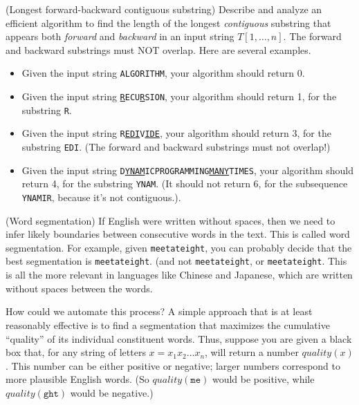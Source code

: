 \newpage
\begin{questions}
  \question[20] (Longest forward-backward contiguous substring) Describe
  and analyze an efficient algorithm to find the length of the longest
  \emph{contiguous} substring that appears both \emph{forward} and
  \emph{backward} in an input string $T[1,\ldots,n]$. The forward and
  backward substrings must NOT overlap.  Here are several examples.
  \begin{itemize}
  \item Given the input string \texttt{ALGORITHM}, your algorithm
    should return 0.

  \item Given the input string
    \texttt{\underline{R}ECU\underline{R}SION}, your algorithm should
    return 1, for the substring \texttt{R}.
  \item Given the input string
    \texttt{R\underline{EDI}V\underline{IDE}}, your algorithm should
    return 3, for the substring \texttt{EDI}. (The forward and backward
    substrings must not overlap!)
  \item Given the input string
    \texttt{D\underline{YNAM}ICPROGRAMMING\underline{MANY}TIMES}, your
    algorithm should return 4, for the substring \texttt{YNAM}. (It
    should not return 6, for the subsequence \texttt{YNAMIR}, because
    it's not contiguous.).
  \end{itemize}
\newpage

  \question[20] (Word segmentation) If English were written without
  spaces, then we need to infer likely boundaries between consecutive
  words in the text. This is called word segmentation. For example,
  given \texttt{meetateight}, you can probably decide that the best
  segmentation is \texttt{meet{}at{}eight}. (and not
  \texttt{me{}et{}at{}eight}, or
  \texttt{meet{}ate{}ight}. This is all the more
  relevant in languages like Chinese and Japanese, which are written
  without spaces between the words.

  How could we automate this process?  A simple approach that is at
  least reasonably effective is to find a segmentation that maximizes
  the cumulative ``quality'' of its individual constituent
  words. Thus, suppose you are given a black box that, for any string
  of letters $x = x_1x_2\ldots x_n$, will return a number
  $quality(x)$. This number can be either positive or negative; larger
  numbers correspond to more plausible English words. (So
  $quality(\texttt{me})$ would be positive, while
  $quality(\texttt{ght})$ would be negative.)


\end{questions}
